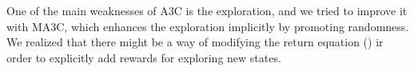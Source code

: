 One of the main weaknesses of \ac{A3C} is the exploration, and we tried to improve it with \ac{MA3C}, which enhances the
exploration implicitly by promoting randomness.
We realized that there might be a way of modifying the return equation () ir order to explicitly add
rewards for exploring new states.

